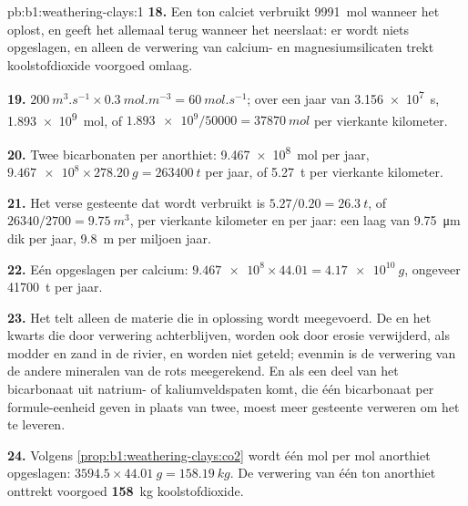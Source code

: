 \begin{solution}{pb:b1:weathering-clays:1}
\textbf{18.} Een ton calciet verbruikt \qty{9991}{mol}  wanneer het oplost, en
geeft het allemaal terug wanneer het neerslaat: er wordt niets opgeslagen, en alleen de
verwering van calcium- en magnesiumsilicaten trekt koolstofdioxide voorgoed omlaag.

\textbf{19.} $\qty{200}{m^3.s^{-1}} \times \qty{0.3}{mol.m^{-3}} =
\qty{60}{mol.s^{-1}}$; over een jaar van \qty{3.156e7}{s}, \qty{1.893e9}{mol}, of
$\num{1.893e9}/\num{50000} = \qty{37870}{mol}$ per vierkante kilometer.

\textbf{20.} Twee bicarbonaten per anorthiet: \qty{9.467e8}{mol} per jaar,
$\num{9.467e8}\times\qty{278.20}{g} = \qty{263400}{t}$ per jaar, of
\qty{5.27}{t} per vierkante kilometer.

\textbf{21.} Het verse gesteente dat wordt verbruikt is $5.27/0.20 = \qty{26.3}{t}$, of
$\num{26340}/2700 = \qty{9.75}{m^3}$, per vierkante kilometer en per jaar: een laag van
\qty{9.75}{\micro m} dik per jaar, \qty{9.8}{m} per miljoen jaar.

\textbf{22.} Eén  opgeslagen per calcium: $\num{9.467e8} \times 44.01 =
\qty{4.17e10}{g}$, ongeveer \qty{41700}{t} per jaar.

\textbf{23.} Het telt alleen de materie die in oplossing wordt meegevoerd. De  en
het kwarts die door verwering achterblijven, worden ook door erosie verwijderd, als modder
en zand in de rivier, en worden niet geteld; evenmin is de verwering van de andere
mineralen van de rots meegerekend. En als een deel van het bicarbonaat uit natrium- of
kaliumveldspaten komt, die één bicarbonaat per formule-eenheid geven in plaats van twee,
moest meer gesteente verweren om het te leveren.

\textbf{24.} Volgens \cref{prop:b1:weathering-clays:co2} wordt één mol  per mol
anorthiet opgeslagen: $3594.5 \times \qty{44.01}{g} = \qty{158.19}{kg}$. De verwering van
één ton anorthiet onttrekt voorgoed \textbf{158}~kg koolstofdioxide.
\end{solution}
